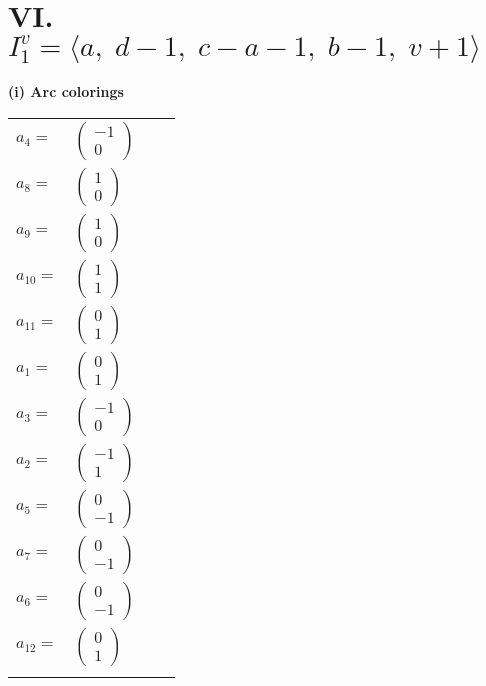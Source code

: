 \documentclass[1p]{elsarticle_modified}
\theoremstyle{definition}
\begin{document}
\centering \section*{VI. $I^v_{1}= \langle a,\;d-1,\;c- a-1,\;b-1,\;v+1 \rangle$}
\flushleft \textbf{(i) Arc colorings}\\
\begin{tabular}{m{7pt} m{180pt} m{7pt} m{180pt} }
\flushright $a_{4}=$&$\begin{pmatrix}-1\\0\end{pmatrix}$ \\
\flushright $a_{8}=$&$\begin{pmatrix}1\\0\end{pmatrix}$ \\
\flushright $a_{9}=$&$\begin{pmatrix}1\\0\end{pmatrix}$ \\
\flushright $a_{10}=$&$\begin{pmatrix}1\\1\end{pmatrix}$ \\
\flushright $a_{11}=$&$\begin{pmatrix}0\\1\end{pmatrix}$ \\
\flushright $a_{1}=$&$\begin{pmatrix}0\\1\end{pmatrix}$ \\
\flushright $a_{3}=$&$\begin{pmatrix}-1\\0\end{pmatrix}$ \\
\flushright $a_{2}=$&$\begin{pmatrix}-1\\1\end{pmatrix}$ \\
\flushright $a_{5}=$&$\begin{pmatrix}0\\-1\end{pmatrix}$ \\
\flushright $a_{7}=$&$\begin{pmatrix}0\\-1\end{pmatrix}$ \\
\flushright $a_{6}=$&$\begin{pmatrix}0\\-1\end{pmatrix}$ \\
\flushright $a_{12}=$&$\begin{pmatrix}0\\1\end{pmatrix}$\\&\end{tabular}
\end{document}
